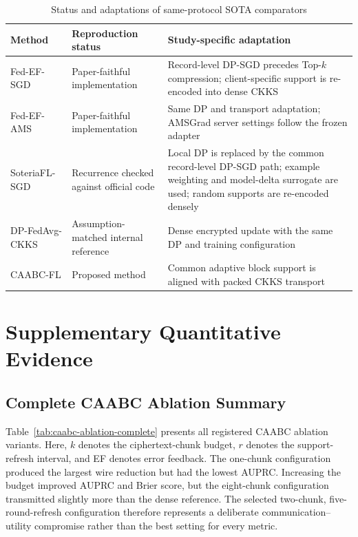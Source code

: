 \begin{table}[htbp]
    \centering
    \caption{Status and adaptations of same-protocol SOTA comparators}
    \label{tab:sota-adaptations}
    \begin{tabularx}{\textwidth}{@{}p{3cm}p{3.2cm}X@{}}
        \toprule
        Method & Reproduction status & Study-specific adaptation \\
        \midrule
        Fed-EF-SGD & Paper-faithful implementation & Record-level DP-SGD precedes Top-$k$ compression; client-specific support is re-encoded into dense CKKS \\
        Fed-EF-AMS & Paper-faithful implementation & Same DP and transport adaptation; AMSGrad server settings follow the frozen adapter \\
        SoteriaFL-SGD & Recurrence checked against official code & Local DP is replaced by the common record-level DP-SGD path; example weighting and model-delta surrogate are used; random supports are re-encoded densely \\
        DP-FedAvg-CKKS & Assumption-matched internal reference & Dense encrypted update with the same DP and training configuration \\
        CAABC-FL & Proposed method & Common adaptive block support is aligned with packed CKKS transport \\
        \bottomrule
    \end{tabularx}
\end{table}


\chapter{Supplementary Quantitative Evidence}
\label{app:supplementary-results}

\section{Complete CAABC Ablation Summary}
\label{appsec:caabc-ablation}

Table~\ref{tab:caabc-ablation-complete} presents all registered CAABC ablation variants. Here, $k$ denotes the ciphertext-chunk budget, $r$ denotes the support-refresh interval, and EF denotes error feedback. The one-chunk configuration produced the largest wire reduction but had the lowest AUPRC. Increasing the budget improved AUPRC and Brier score, but the eight-chunk configuration transmitted slightly more than the dense reference. The selected two-chunk, five-round-refresh configuration therefore represents a deliberate communication--utility compromise rather than the best setting for every metric.


